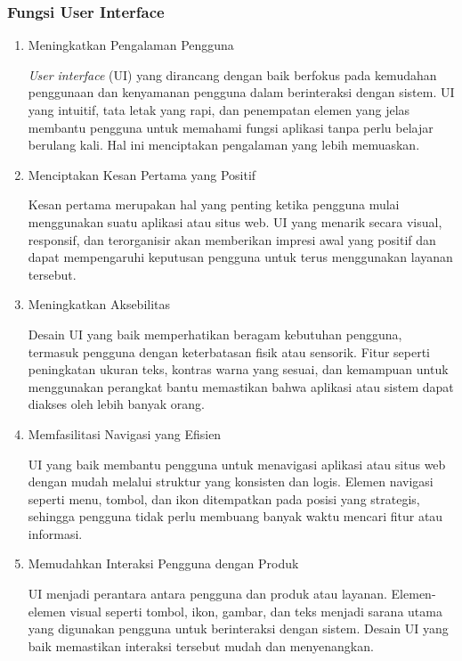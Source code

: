 \documentclass[12pt]{article}
\begin{document}
\subsubsection{Fungsi User Interface}
\begin{enumerate}
    \item Meningkatkan Pengalaman Pengguna
    \par \emph{User interface} (UI) yang dirancang dengan baik berfokus pada kemudahan penggunaan dan kenyamanan pengguna dalam berinteraksi dengan sistem. UI yang intuitif, tata letak yang rapi, dan penempatan elemen yang jelas membantu pengguna untuk memahami fungsi aplikasi tanpa perlu belajar berulang kali. Hal ini menciptakan pengalaman yang lebih memuaskan.

    \item Menciptakan Kesan Pertama yang Positif
    \par Kesan pertama merupakan hal yang penting ketika pengguna mulai menggunakan suatu aplikasi atau situs web. UI yang menarik secara visual, responsif, dan terorganisir akan memberikan impresi awal yang positif dan dapat mempengaruhi keputusan pengguna untuk terus menggunakan layanan tersebut.

    \item Meningkatkan Aksebilitas
    \par Desain UI yang baik memperhatikan beragam kebutuhan pengguna, termasuk pengguna dengan keterbatasan fisik atau sensorik. Fitur seperti peningkatan ukuran teks, kontras warna yang sesuai, dan kemampuan untuk menggunakan perangkat bantu memastikan bahwa aplikasi atau sistem dapat diakses oleh lebih banyak orang.

    \item Memfasilitasi Navigasi yang Efisien
    \par UI yang baik membantu pengguna untuk menavigasi aplikasi atau situs web dengan mudah melalui struktur yang konsisten dan logis. Elemen navigasi seperti menu, tombol, dan ikon ditempatkan pada posisi yang strategis, sehingga pengguna tidak perlu membuang banyak waktu mencari fitur atau informasi.

    \item Memudahkan Interaksi Pengguna dengan Produk
    \par UI menjadi perantara antara pengguna dan produk atau layanan. Elemen-elemen visual seperti tombol, ikon, gambar, dan teks menjadi sarana utama yang digunakan pengguna untuk berinteraksi dengan sistem. Desain UI yang baik memastikan interaksi tersebut mudah dan menyenangkan.
\end{enumerate}
\end{document}
